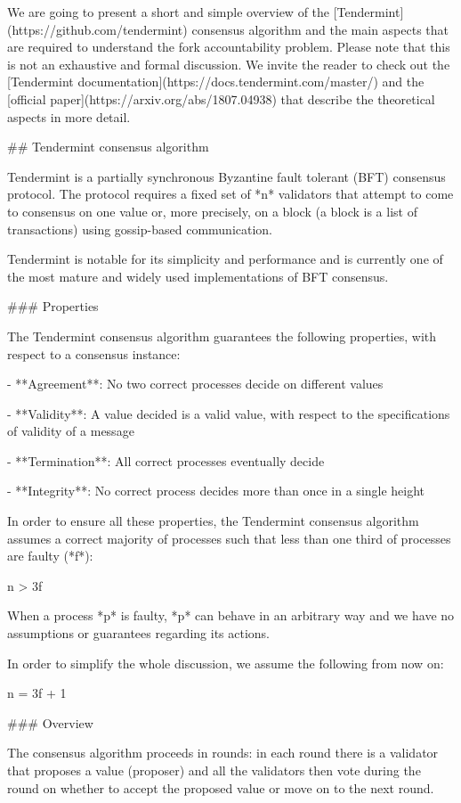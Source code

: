 \documentclass[a4paper,11pt,oneside]{report}
\begin{document}
\begin{markdown}

We are going to present a short and simple overview of the [Tendermint](https://github.com/tendermint) consensus algorithm and the main aspects that are required to understand the fork accountability problem. 
Please note that this is not an exhaustive and formal discussion. We invite the reader to check out the [Tendermint documentation](https://docs.tendermint.com/master/) and the [official paper](https://arxiv.org/abs/1807.04938) that describe the theoretical aspects in more detail.   

## Tendermint consensus algorithm

Tendermint is a partially synchronous Byzantine fault tolerant (BFT) consensus protocol. The protocol requires a fixed set of *n* validators that attempt to come to consensus on one value or, more precisely, on a block (a block is a list of transactions) using gossip-based communication. 

Tendermint is notable for its simplicity and performance and is currently one of the most mature and widely used implementations of BFT consensus.

### Properties 

The Tendermint consensus algorithm guarantees the following properties, with respect to a consensus instance:

- **Agreement**: No two correct processes decide on different values

- **Validity**: A value decided is a valid value, with respect to the specifications of validity of a message

- **Termination**: All correct processes eventually decide

- **Integrity**: No correct process decides more than once in a single height 

In order to ensure all these properties, the Tendermint consensus algorithm assumes a correct majority of processes such that less than one third of processes are faulty (*f*):
 
    n > 3f
 
When a process *p* is faulty, *p* can behave in an arbitrary way and we have no assumptions or guarantees regarding its actions.
 
In order to simplify the whole discussion, we assume the following from now on:
 
    n = 3f + 1

### Overview

The consensus algorithm proceeds in rounds: in each round there is a validator that proposes a value (proposer) and all the validators then vote during the round on whether to accept the proposed value or move on to the next round.


\end{markdown}
\end{document}
